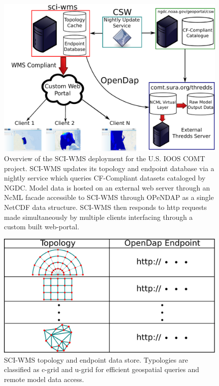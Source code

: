 \documentclass[11pt,twocolumn,twoside]{IEEEtran}
\newcommand{\comt}{COMT}
\newcommand{\ioos}{IOOS}
\newcommand{\ugrid}{u-grid}
\newcommand{\cgrid}{c-grid}
\newcommand{\ncml}{NcML}
\newcommand{\ngdc}{NGDC}
\newcommand{\opendap}{OPeNDAP}
\newcommand{\netcdf}{NetCDF}
\newcommand{\sciwms}{SCI-WMS}
\newcommand{\Sciwms}{SCI-WMS}
\begin{document}
\begin{figure}
  \centering
  \includegraphics[width=\columnwidth]{./figs/overview.pdf}
  \caption{Overview of the \sciwms{} deployment for the U.S. \ioos{}
    \comt{} project. \Sciwms{} updates its topology and endpoint
    database via a nightly service which queries CF-Compliant datasets
    cataloged by \ngdc{}. Model data is hosted on an external web
    server through an \ncml{} facade accessible to \sciwms{} through
    \opendap{} as a single \netcdf{} data structure. \Sciwms{} then
    responds to http requests made simultaneously by multiple clients
    interfacing through a custom built web-portal.}
  \label{fig:overview1}
\end{figure}

\begin{figure}
  \centering
  \includegraphics[width=0.8\columnwidth]{./figs/sciwms_db_topology_endpoints.pdf}
  \caption{\Sciwms{} topology and endpoint data store. Typologies are
    classified as \cgrid{} and \ugrid{} for efficient geospatial
    queries and remote model data access.}
  \label{fig:sciwms_topology_endpoints}
\end{figure}
\end{document}
